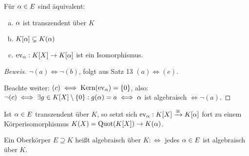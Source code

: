 \documentclass[a4paper]{report}
\begin{document}
\begin{kor}
  Für $\alpha \in E$ sind äquivalent:
  \begin{enumerate}[(a)]
    \item $\alpha$ ist transzendent über $K$
    \item $K[\alpha] \subsetneq K(\alpha)$
    \item $\operatorname{ev}_\alpha: K[X] \to K[\alpha]$ ist ein Isomorphismus.
  \end{enumerate}
  \begin{proof}[Beweis]
    \item $\neg (a) \iff \neg (b)$, folgt aus Satz 13 $(a) \iff (e)$.
    \item Beachte weiter: $(c) \iff \operatorname{Kern}(\operatorname{ev}_{\alpha}) = \{0\}$, also: $\neg(c) \iff \exists g \in K[X] \setminus \{0\} : g(\alpha) = a \iff \alpha$ ist algebraisch $\iff \neg (a)$.
\end{proof}
\end{kor}

\begin{bem*}
Ist $\alpha \in E$ transzendent über $K$, so setzt sich $\operatorname{ev}_{\alpha} : K[X] \xrightarrow{\cong} K[\alpha]$ fort zu einem Körperisomorphismus $K(X) = \operatorname{Quot}(K[X])\to K(\alpha)$.
\end{bem*}

\begin{defi}
Ein Oberkörper $E \supseteq K$ heißt algebraisch über $K :\iff$ jedes $\alpha \in E$ ist algebraisch über $K$.
\end{defi}
\end{document}
